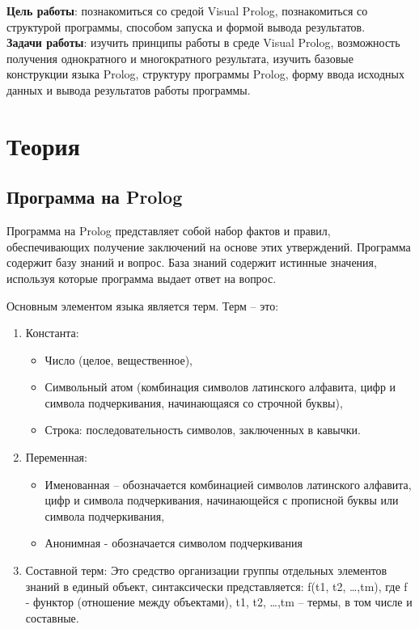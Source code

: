 \documentclass[a4paper,12pt]{article}
\begin{document}
	


\textbf{Цель работы}: познакомиться со средой Visual Prolog, познакомиться со структурой программы, способом запуска и формой вывода результатов.\\

\textbf{Задачи работы}: изучить принципы работы в среде Visual Prolog, возможность получения однократного и многократного результата, изучить базовые конструкции языка Prolog, структуру программы Prolog, форму ввода исходных данных и вывода результатов работы программы.

\section*{Теория}

\subsection*{Программа на Prolog}

Программа на Prolog представляет собой набор фактов и правил, обеспечивающих получение заключений на основе этих утверждений. Программа содержит базу знаний и вопрос. База знаний содержит истинные значения, используя которые программа выдает ответ на вопрос. 

Основным элементом языка является терм. Терм – это:
\begin{enumerate}
	\item Константа: 
	\begin{itemize}
		\item Число (целое, вещественное),
		\item Символьный атом (комбинация символов латинского алфавита, цифр и символа подчеркивания, начинающаяся со строчной буквы),
		\item Строка: последовательность символов, заключенных в кавычки.
	\end{itemize}
	\item Переменная:
	\begin{itemize}
		\item Именованная – обозначается комбинацией символов латинского алфавита, цифр и символа подчеркивания, начинающейся с прописной буквы или символа подчеркивания,
		\item Анонимная  - обозначается символом подчеркивания
	\end{itemize}
	\item Составной терм:
		Это средство организации группы отдельных элементов знаний в единый  объект,  синтаксически представляется: f(t1, t2, …,tm), где f -  функтор (отношение между объектами), t1, t2, …,tm – термы, в том  числе  и составные.
\end{enumerate}
\end{document}

